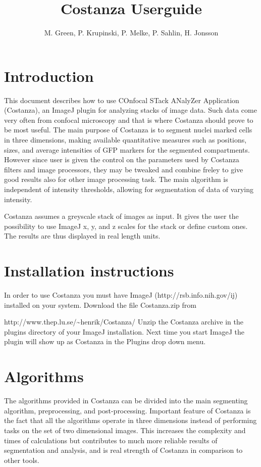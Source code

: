 \documentclass[a4paper,12pt]{article}
\title{Costanza Userguide}
\author{M. Green, P. Krupinski, P. Melke, P. Sahlin, H. Jonsson}
\begin{document}
\maketitle


\section{Introduction}
This document describes how to use COnfocal STack ANalyZer Application
(Costanza), an ImageJ\cite{Abramoff2004} plugin for analyzing
stacks of image data. Such data come very often from confocal microscopy and that is where Costanza should prove to be most useful. The main purpose of Costanza is to segment nuclei marked cells
in three dimensions, making available quantitative measures such as
positions, sizes, and average intensities of GFP markers for the
segmented compartments. However since user is given the control on the parameters used by Costanza filters and image processors, they may be tweaked and combine freley to give good results also for other image processing task. The main algorithm is independent of intensity
thresholds, allowing for segmentation of data of varying intensity.

Costanza assumes a greyscale stack of images as input. It gives the user the possibility to use ImageJ x, y, and z scales for the stack or define custom ones. The results are thus displayed in real length units. 

\section{Installation instructions}
In order to use Costanza you must have ImageJ
(http://rsb.info.nih.gov/ij) installed on your system. Download the
file Costanza.zip from

http://www.thep.lu.se/\~{}henrik/Costanza/
Unzip the Costanza archive in the plugins directory of your ImageJ
installation. Next time you start ImageJ the plugin will show up as Costanza
in the Plugins drop down menu.

\section{Algorithms}
The algorithms provided in Costanza can be divided into the main
segmenting algorithm, preprocessing, and post-processing. Important feature of Costanza is the fact that all the algorithms operate in three dimensions instead of performing tasks on the set of two dimensional images. This increases the complexity and times of calculations but contributes to much more reliable results of segmentation and analysis, and is real strength of Costanza in comparison to other tools.
\end{document}
